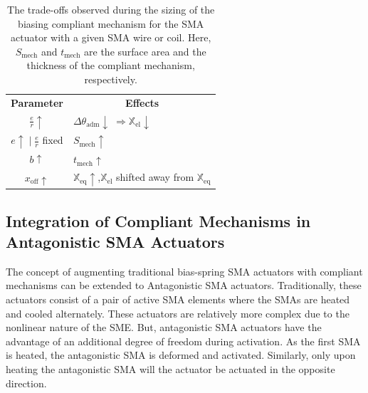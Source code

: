 \begin{table}[ht]
    \centering
    \caption{The trade-offs observed during the sizing of the biasing compliant mechanism for the SMA actuator with a given SMA wire or coil. Here, $S_{\text{mech}}$ and $t_{\text{mech}}$ are the surface area and the thickness of the compliant mechanism, respectively.}
    \label{tab:sma-pt-tradeoffs}
    \begin{tabular}{ c l l }
        \hline
        \rowcolor{black} \textbf{\color{white} Parameter} & \multicolumn{2}{c}{\textbf{\color{white} Effects}}\\
        \cellcolor{black!5}$\frac{e}{r} \uparrow$ & \cellcolor{black!5} $\Delta\theta_\text{adm} \downarrow \;  \Rightarrow \mathbb{X}_\text{el} \downarrow$  & \cellcolor{black!5}  \\

        \cellcolor{black!10} $e \uparrow \;|\; \frac{e}{r}$ fixed & \cellcolor{black!10} $S_{\text{mech}}\uparrow $ & \cellcolor{black!5} \\

        \cellcolor{black!5} $b \uparrow$ & \cellcolor{black!5} $t_{\text{mech}}\uparrow $ &\cellcolor{black!5} \multirow{-3}{*}{$K_\theta \uparrow \;
        \Rightarrow \begin{cases} \mathbb{X}_\text{eq} \uparrow\\ F_\text{grip} \downarrow\\
        \end{cases}$}     \\

         \rowcolor{black!10} $x_{\text{off}}\uparrow$ & \multicolumn{2}{l}{$\mathbb{X}_\text{eq}\uparrow$,\quad $\mathbb{X}_\text{el}$ shifted away from $\mathbb{X}_\text{eq}$}\\
    \end{tabular}
\end{table}

\subsection{Integration of Compliant Mechanisms in Antagonistic SMA Actuators}\label{subsec:design-methodology-antagonistic}

The concept of augmenting traditional bias-spring SMA actuators with compliant mechanisms can be extended to Antagonistic SMA actuators. Traditionally, these actuators consist of a pair of active SMA elements where the SMAs are heated and cooled alternately. These actuators are relatively more complex due to the nonlinear nature of the SME. But, antagonistic SMA actuators have the advantage of an additional degree of freedom during activation. As the first SMA is heated, the antagonistic SMA is deformed and activated. Similarly, only upon heating the antagonistic SMA will the actuator be actuated in the opposite direction.

